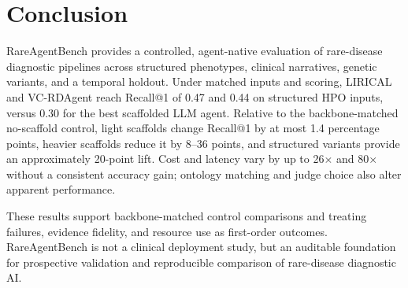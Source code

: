 \documentclass[letterpaper]{article} %
\begin{document}
\section{Conclusion}
\label{sec-10}

RareAgentBench provides a controlled, agent-native evaluation of rare-disease
diagnostic pipelines across structured phenotypes, clinical narratives,
genetic variants, and a temporal holdout. Under matched inputs and scoring,
LIRICAL and VC-RDAgent reach Recall@1 of 0.47 and 0.44 on structured HPO
inputs, versus 0.30 for the best scaffolded LLM agent. Relative to the
backbone-matched no-scaffold control, light scaffolds change Recall@1 by at
most 1.4 percentage points, heavier scaffolds reduce it by 8--36 points, and
structured variants provide an approximately 20-point lift. Cost and latency
vary by up to 26$\times$ and 80$\times$ without a consistent accuracy gain;
ontology matching and judge choice also alter apparent performance.

These results support backbone-matched control comparisons and treating
failures, evidence fidelity, and resource use as first-order outcomes.
RareAgentBench is not a clinical deployment study, but an auditable foundation
for prospective validation and reproducible comparison of rare-disease
diagnostic AI.

\clearpage

% 

\end{document}
